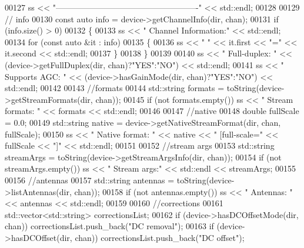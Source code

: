 \begin{DoxyCode}
00127     ss << \textcolor{stringliteral}{"----------------------------------------------------"} << std::endl;
00128 
00129     \textcolor{comment}{// info}
00130     \textcolor{keyword}{const} \textcolor{keyword}{auto} info = device->getChannelInfo(dir, chan);
00131     \textcolor{keywordflow}{if} (info.size() > 0)
00132     \{
00133         ss << \textcolor{stringliteral}{"  Channel Information:"} << std::endl;
00134         \textcolor{keywordflow}{for} (\textcolor{keyword}{const} \textcolor{keyword}{auto} &it : info)
00135         \{
00136             ss << \textcolor{stringliteral}{"    "} << it.first << \textcolor{stringliteral}{"="} << it.second << std::endl;
00137         \}
00138     \}
00139 
00140     ss << \textcolor{stringliteral}{"  Full-duplex: "} << (device->getFullDuplex(dir, chan)?\textcolor{stringliteral}{"YES"}:\textcolor{stringliteral}{"NO"}) << std::endl;
00141     ss << \textcolor{stringliteral}{"  Supports AGC: "} << (device->hasGainMode(dir, chan)?\textcolor{stringliteral}{"YES"}:\textcolor{stringliteral}{"NO"}) << std::endl;
00142 
00143     \textcolor{comment}{//formats}
00144     std::string formats = toString(device->getStreamFormats(dir, chan));
00145     \textcolor{keywordflow}{if} (not formats.empty()) ss << \textcolor{stringliteral}{"  Stream formats: "} << formats << std::endl;
00146 
00147     \textcolor{comment}{//native}
00148     \textcolor{keywordtype}{double} fullScale = 0.0;
00149     std::string native = device->getNativeStreamFormat(dir, chan, fullScale);
00150     ss << \textcolor{stringliteral}{"  Native format: "} << native << \textcolor{stringliteral}{" [full-scale="} << fullScale << \textcolor{stringliteral}{"]"} << std::endl;    
00151 
00152     \textcolor{comment}{//stream args}
00153     std::string streamArgs = toString(device->getStreamArgsInfo(dir, chan));
00154     \textcolor{keywordflow}{if} (not streamArgs.empty()) ss << \textcolor{stringliteral}{"  Stream args:"} << std::endl << streamArgs;
00155 
00156     \textcolor{comment}{//antennas}
00157     std::string antennas = toString(device->listAntennas(dir, chan));
00158     \textcolor{keywordflow}{if} (not antennas.empty()) ss << \textcolor{stringliteral}{"  Antennas: "} << antennas << std::endl;
00159 
00160     \textcolor{comment}{//corrections}
00161     std::vector<std::string> correctionsList;
00162     \textcolor{keywordflow}{if} (device->hasDCOffsetMode(dir, chan)) correctionsList.push\_back(\textcolor{stringliteral}{"DC removal"});
00163     \textcolor{keywordflow}{if} (device->hasDCOffset(dir, chan)) correctionsList.push\_back(\textcolor{stringliteral}{"DC offset"});

\end{DoxyCode}
